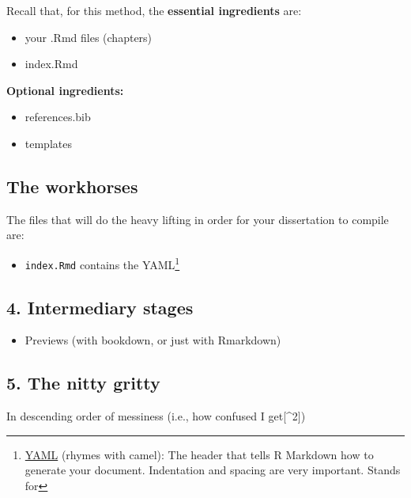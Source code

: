 \documentclass[
  12pt,
  oneside]{book}
\providecommand{\tightlist}{%
  \setlength{\itemsep}{0pt}\setlength{\parskip}{0pt}}
\numberwithin{figure}{chapter}
\begin{document}
Recall that, for this method, the \textbf{essential ingredients} are:

\begin{itemize}
\tightlist
\item
  your .Rmd files (chapters)
\item
  index.Rmd
\end{itemize}

\textbf{Optional ingredients:}

\begin{itemize}
\tightlist
\item
  references.bib
\item
  templates
\end{itemize}

\hypertarget{the-workhorses}{%
\subsection{The workhorses}\label{the-workhorses}}

The files that will do the heavy lifting in order for your dissertation to compile are:

\begin{itemize}
\tightlist
\item
  \texttt{index.Rmd} contains the YAML\footnote{\href{https://en.wikipedia.org/wiki/YAML}{YAML} (rhymes with camel): The header that tells R Markdown how to generate your document. Indentation and spacing are very important. Stands for}
\end{itemize}

\hypertarget{intermediary-stages}{%
\subsection{4. Intermediary stages}\label{intermediary-stages}}

\begin{itemize}
\tightlist
\item
  Previews (with bookdown, or just with Rmarkdown)
\end{itemize}

\hypertarget{the-nitty-gritty}{%
\subsection{5. The nitty gritty}\label{the-nitty-gritty}}

In descending order of messiness (i.e., how confused I get{[}\^{}2{]})
\end{document}
